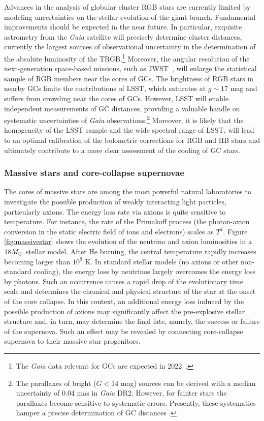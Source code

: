 Advances in the analysis of globular cluster RGB stars are currently limited by modeling uncertainties on the stellar evolution of the giant branch.
Fundamental improvements should be expected in the near future. 
In particular, exquisite astrometry from the {\it Gaia} satellite will precisely determine cluster distances, currently the largest sources of observational uncertainty in the determination of the absolute luminosity of the TRGB.\footnote{The {\it Gaia} data relevant for GCs are expected in 2022~\citep{Gaia}.}
Moreover, the angular resolution of the next-generation space-based missions, such as JWST~\citep{Gardner:2006ky}, will enlarge the statistical sample of RGB members near the cores of GCs. 
The brightness of RGB stars in nearby GCs limits the contributions of LSST, which saturates at $g \sim 17$ mag and suffers from crowding near the cores of GCs.
However, LSST will enable independent measurements of GC distances, providing a valuable handle on systematic uncertainties of {\it Gaia} observations.\footnote{The parallaxes of bright ($G<14$ mag) sources can be derived with a median uncertainty of 0.04 mas in {\it Gaia} DR2. However, for fainter stars the parallaxes become sensitive to systematic errors.  Presently, these systematics hamper a precise determination of GC distances \citep{Chen:2018}.}
Moreover, it is likely that the homogeneity of the LSST sample and the wide spectral range of LSST, will lead to an optimal calibration of the bolometric corrections for RGB and HB stars and ultimately contribute to a more clear assessment of the cooling of GC stars.


\subsubsection{Massive stars and core-collapse supernovae}

The cores of massive stars are among the most powerful natural laboratories to investigate the possible production of weakly interacting light particles, particularly axions. 
The energy loss rate via axions is quite sensitive to temperature. 
For instance, the rate of the Primakoff process (the photon-axion conversion in the static electric field of ions and electrons) scales as $T^4$. 
Figure \ref{fig:massivestar} shows the evolution of the neutrino and axion luminosities in a $18M_\odot$ stellar model. 
After He burning, the central temperature rapidly increases becoming larger than $10^9$ K. 
In standard stellar models (no axions or other non-standard cooling), the energy loss by neutrinos largely overcomes the energy loss by photons. Such an occurrence causes a rapid drop of the evolutionary time scale and determines the chemical and physical structure of the star at the onset of the core collapse. 
In this context, an additional energy loss induced by the possible production of axions may significantly affect the pre-explosive stellar structure and, in turn, may determine the final fate, namely, the success or failure of the supernova. 
Such an effect may be revealed by connecting core-collapse supernova to their massive star progenitors.

